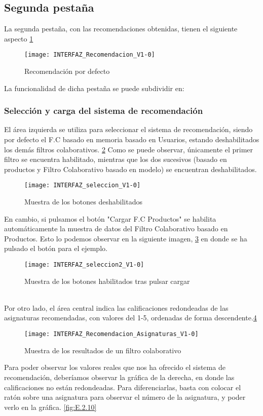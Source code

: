 \subsection{Segunda pestaña}
La segunda pestaña, con las recomendaciones obtenidas, tienen el siguiente aspecto \ref{fig:E.2.6}
\begin{figure}[h]
\centering
\texttt{[image: INTERFAZ\_Recomendacion\_V1-0]}
\caption{Recomendación por defecto}
\label{fig:E.2.6}
\end{figure}
La funcionalidad de dicha pestaña se puede subdividir en: 
\subsubsection{Selección y carga del sistema de recomendación}
El área izquierda se utiliza para seleccionar el sistema de recomendación, siendo por defecto el F.C basado en memoria basado en Usuarios, estando deshabilitados los demás filtros colaborativos. \ref{fig:E.2.7} Como se puede observar, únicamente el primer filtro se encuentra habilitado, mientras que los dos sucesivos (basado en productos y  Filtro Colaborativo basado en modelo) se encuentran deshabilitados. 
\begin{figure}[h]
\centering
\texttt{[image: INTERFAZ\_seleccion\_V1-0]}
\caption{Muestra de los botones deshabilitados}
\label{fig:E.2.7}
\end{figure}
En cambio, si pulsamos el botón "Cargar F.C Productos" se habilita automáticamente la muestra de datos del Filtro Colaborativo basado en Productos. Esto lo podemos observar en la siguiente imagen, \ref{fig:E.2.8} en donde se ha pulsado el botón para el ejemplo. 
\begin{figure}[h]
\centering
\texttt{[image: INTERFAZ\_seleccion2\_V1-0]}
\caption{Muestra de los botones habilitados tras pulsar cargar}
\label{fig:E.2.8}
\end{figure}
\\
Por otro lado, el área central indica las calificaciones redondeadas de las asignaturas recomendadas, con valores del 1-5, ordenadas de forma descendente.\ref{fig:E.2.9} 
\begin{figure}[h]
\centering
\texttt{[image: INTERFAZ\_Recomendacion\_Asignaturas\_V1-0]}
\caption{Muestra de los resultados de un filtro colaborativo}
\label{fig:E.2.9}
\end{figure}
Para poder observar los valores reales que nos ha ofrecido el sistema de recomendación, deberíamos observar la gráfica de la derecha, en donde las calificaciones no están redondeadas. Para diferenciarlas, basta con colocar el ratón sobre una asignatura para observar el número de la asignatura, y poder verlo en la gráfica. \ref{fig:E.2.10} 

